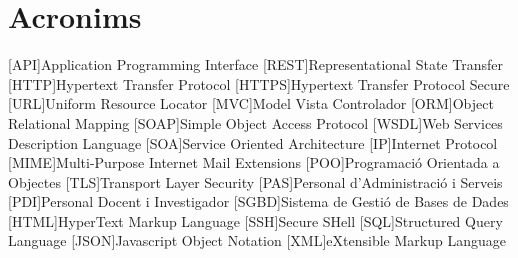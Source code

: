\chapter{Acronims} 
\begin{acronym}

[API]{Application Programming Interface}
[REST]{Representational State Transfer}
[HTTP]{Hypertext Transfer Protocol}
[HTTPS]{Hypertext Transfer Protocol Secure}
[URL]{Uniform Resource Locator}
[MVC]{Model Vista Controlador}
[ORM]{Object Relational Mapping}
[SOAP]{Simple Object Access Protocol}
[WSDL]{Web Services Description Language}
[SOA]{Service Oriented Architecture}
[IP]{Internet Protocol}
[MIME]{Multi-Purpose Internet Mail Extensions}
[POO]{Programació Orientada a Objectes}
[TLS]{Transport Layer Security}
[PAS]{Personal d'Administració i Serveis}
[PDI]{Personal Docent i Investigador}
[SGBD]{Sistema de Gestió de Bases de Dades}
[HTML]{HyperText Markup Language}
[SSH]{Secure SHell}
[SQL]{Structured Query Language}
[JSON]{Javascript Object Notation}
[XML]{eXtensible Markup Language}
\end{acronym}
